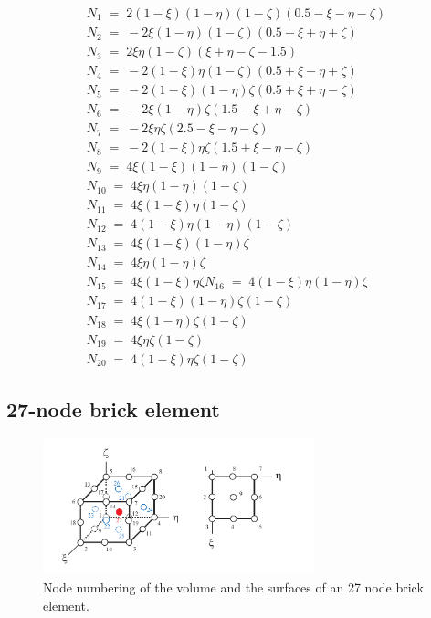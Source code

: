 \documentclass{article}
\begin{document}
\begin{eqnarray}
      N_1 \;=\; 2(1-\xi)(1-\eta)(1-\zeta)(0.5-\xi-\eta-\zeta) \\
    	N_2 \;=\;-2\xi(1-\eta)(1-\zeta)(0.5-\xi+\eta+\zeta) \\
    	N_3 \;=\;2\xi\eta(1-\zeta)(\xi+\eta-\zeta-1.5) \\
      N_4 \;=\;-2(1-\xi)\eta(1-\zeta)(0.5+\xi-\eta+\zeta) \\
      N_5 \;=\;-2(1-\xi)(1-\eta)\zeta(0.5+\xi+\eta-\zeta) \\
     	N_6 \;=\;-2\xi(1-\eta)\zeta(1.5-\xi+\eta-\zeta) \\ 
      N_7 \;=\;-2\xi\eta\zeta(2.5-\xi-\eta-\zeta) \\
      N_8 \;=\;-2(1-\xi)\eta\zeta(1.5+\xi-\eta-\zeta) \\
      N_9 \;=\;4\xi(1-\xi)(1-\eta)(1-\zeta) \\
      N_{10} \;=\;4\xi\eta(1-\eta)(1-\zeta) \\
      N_{11} \;=\;4\xi(1-\xi)\eta(1-\zeta) \\
      N_{12} \;=\;4(1-\xi)\eta(1-\eta)(1-\zeta) \\
      N_{13} \;=\;4\xi(1-\xi)(1-\eta)\zeta \\
      N_{14} \;=\;4\xi\eta(1-\eta)\zeta \\
      N_{15} \;=\;4\xi(1-\xi)\eta\zeta     
      N_{16} \;=\;4(1-\xi)\eta(1-\eta)\zeta \\
      N_{17} \;=\;4(1-\xi)(1-\eta)\zeta(1-\zeta) \\
      N_{18} \;=\;4\xi(1-\eta)\zeta(1-\zeta) \\
      N_{19} \;=\;4\xi\eta\zeta(1-\zeta) \\
      N_{20} \;=\;4(1-\xi)\eta\zeta(1-\zeta)
 \end{eqnarray}


\subsection{27-node brick element}
\begin{figure}[ht!]
    \centering
            \includegraphics[width=0.7\textwidth]{27nodebrick.pdf}
    \caption{Node numbering of the volume and the surfaces of an 27 node brick element.}
    \label{fig3}
\end{figure}
\end{document}
